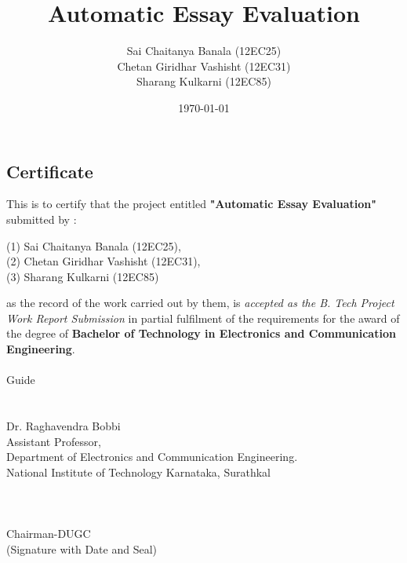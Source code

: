 \documentclass[BTech]{nitkdiss}
\begin{document}
\begin{center}
\section*{Certificate}
\end{center}
This is to certify that the project entitled \textbf{"Automatic Essay Evaluation"} submitted by : \\
\begin{center}
(1) Sai Chaitanya Banala (12EC25),\\
(2) Chetan Giridhar Vashisht (12EC31),\\
(3) Sharang Kulkarni (12EC85)
\end{center}
as the record of the work carried out by them, is \textit{accepted as the B. Tech Project Work Report Submission} in partial fulfilment of the requirements for the award of the degree of \textbf{Bachelor of Technology in Electronics and Communication Engineering}.\\ \\  
Guide
\\
\\
\\
Dr. Raghavendra Bobbi\\
Assistant Professor,\\
Department of Electronics and Communication Engineering.\\
National Institute of Technology Karnataka, Surathkal
\\
\\
\\
\\
Chairman-DUGC\\
(Signature with Date and Seal)







\title{Automatic Essay Evaluation}
\author{Sai Chaitanya Banala (12EC25)\\ Chetan Giridhar Vashisht (12EC31)\\ Sharang Kulkarni (12EC85)\\}
\date{\today}




\maketitle
\end{document}
